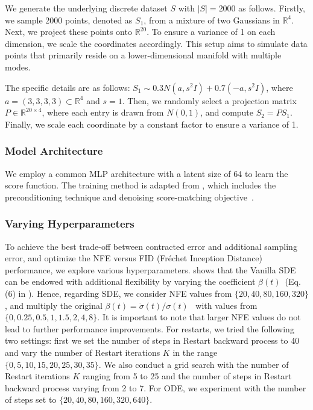 We generate the underlying discrete dataset $S$ with $|S|=2000$ as follows. Firstly, we sample 2000 points, denoted as $S_1$, from a mixture of two Gaussians in $\mathbb{R}^4$. Next, we project these points onto $\mathbb{R}^{20}$. To ensure a variance of 1 on each dimension, we scale the coordinates accordingly. This setup aims to simulate data points that primarily reside on a lower-dimensional manifold with multiple modes.

The specific details are as follows: $S_1 \sim 0.3 N(a, s^2I) + 0.7(-a, s^2I)$, where $a=(3,3,3,3)\subset \mathbb{R}^4$ and $s=1$. Then, we randomly select a projection matrix $P\in \mathbb{R}^{20\times 4}$, where each entry is drawn from $N(0, 1)$, and compute $S_2=PS_1$. Finally, we scale each coordinate by a constant factor to ensure a variance of 1.

\subsubsection{Model Architecture}

We employ a common MLP architecture with a latent size of 64 to learn the score function. The training method is adapted from \cite{Karras2022ElucidatingTD}, which includes the preconditioning technique and denoising score-matching objective~\cite{Vincent2011ACB}.

\subsubsection{Varying Hyperparameters}

To achieve the best trade-off between contracted error and additional sampling error, and optimize the NFE versus FID (Fréchet Inception Distance) performance, we explore various hyperparameters. \cite{Karras2022ElucidatingTD} shows that the Vanilla SDE can be endowed with additional flexibility by varying the coefficient $\beta(t)$~(Eq.(6) in \cite{Karras2022ElucidatingTD}). Hence, regarding SDE, we consider NFE values from $\{20, 40, 80, 160, 320\}$, and multiply the original $\beta(t)=\dot{\sigma}(t)/\sigma(t)$~\cite{Karras2022ElucidatingTD} with values from $\{0, 0.25, 0.5, 1, 1.5, 2, 4, 8\}$. It is important to note that larger NFE values do not lead to further performance improvements. For restarts, we tried the following two settings: first we set the number of steps in Restart backward process to 40 and vary the number of Restart iterations $K$ in the range $\{0, 5, 10, 15, 20, 25, 30, 35\}$. We also conduct a grid search with the number of Restart iterations $K$ ranging from 5 to 25 and the number of steps in Restart backward process varying from 2 to 7. For ODE, we experiment with the number of steps set to $\{20, 40, 80, 160, 320, 640\}$.

